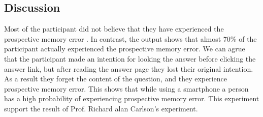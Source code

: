 \subsection{Discussion}

Most of the participant did not believe that they have experienced the prospective memory error
. In contrast, the output shows that  almost 70\% of the participant actually experienced the prospective memory error.
We can agrue that the participant made an intention for looking the answer before clicking the answer link, but after reading the answer page
they lost their original intention.
As a result they forget the content of the question, and they experience prospective memory error.
This shows that while using a smartphone a person has a high probability of experiencing prospective memory error.
This experiment support the result of Prof. Richard alan Carlson's experiment.



